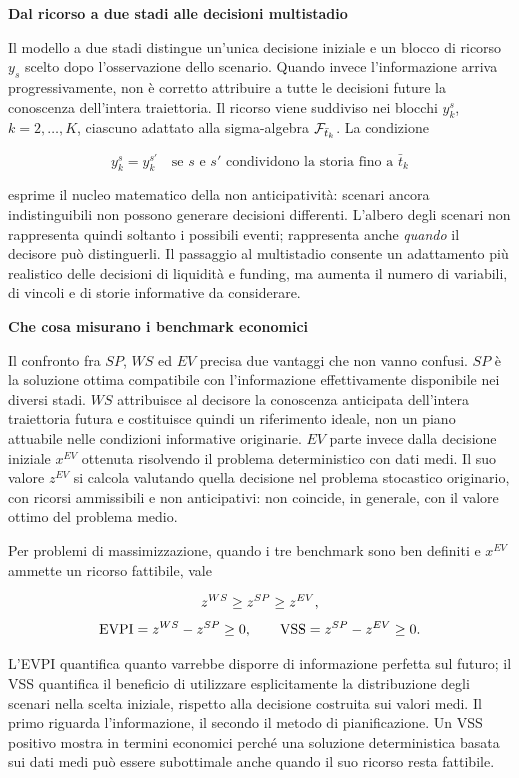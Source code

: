 \medskip
\noindent
\textbf{Dal ricorso a due stadi alle decisioni multistadio}

Il modello a due stadi distingue un'unica decisione iniziale e
un blocco di ricorso $y_s$ scelto dopo l'osservazione dello
scenario. Quando invece l'informazione arriva progressivamente,
non \`e corretto attribuire a tutte le decisioni future la
conoscenza dell'intera traiettoria. Il ricorso viene suddiviso nei
blocchi $y_k^s$, $k=2,\ldots,K$, ciascuno adattato alla
sigma-algebra $\mathcal{F}_{\bar t_k}$. La condizione

\[
y_k^s=y_k^{s'}
\quad\text{se }s\text{ e }s'\text{ condividono la storia fino a }\bar t_k
\]

\noindent
esprime il nucleo matematico della non anticipativit\`a:
scenari ancora indistinguibili non possono generare decisioni
differenti. L'albero degli scenari non rappresenta quindi soltanto
i possibili eventi; rappresenta anche \emph{quando} il decisore
pu\`o distinguerli. Il passaggio al multistadio consente un
adattamento pi\`u realistico delle decisioni di liquidit\`a e
funding, ma aumenta il numero di variabili, di vincoli e di
storie informative da considerare.

\medskip
\noindent
\textbf{Che cosa misurano i benchmark economici}

Il confronto fra $SP$, $WS$ ed $EV$ precisa due vantaggi che non
vanno confusi. $SP$ \`e la soluzione ottima compatibile con
l'informazione effettivamente disponibile nei diversi stadi.
$WS$ attribuisce al decisore la conoscenza anticipata dell'intera
traiettoria futura e costituisce quindi un riferimento ideale,
non un piano attuabile nelle condizioni informative originarie.
$EV$ parte invece dalla decisione iniziale $x^{EV}$ ottenuta
risolvendo il problema deterministico con dati medi. Il suo valore
$z^{EV}$ si calcola valutando quella decisione nel problema
stocastico originario, con ricorsi ammissibili e non anticipativi:
non coincide, in generale, con il valore ottimo del problema medio.

Per problemi di massimizzazione, quando i tre benchmark sono ben
definiti e $x^{EV}$ ammette un ricorso fattibile, vale

\[
\begin{gathered}
z^{WS}\geq z^{SP}\geq z^{EV},\\[3pt]
\operatorname{EVPI}=z^{WS}-z^{SP}\geq0,
\qquad
\operatorname{VSS}=z^{SP}-z^{EV}\geq0.
\end{gathered}
\]

L'EVPI quantifica quanto varrebbe disporre di informazione
perfetta sul futuro; il VSS quantifica il beneficio di
utilizzare esplicitamente la distribuzione degli scenari nella
scelta iniziale, rispetto alla decisione costruita sui valori
medi. Il primo riguarda l'informazione, il secondo il metodo di
pianificazione. Un VSS positivo mostra in termini economici
perch\'{e} una soluzione deterministica basata sui dati medi pu\`o
essere subottimale anche quando il suo ricorso resta fattibile.

